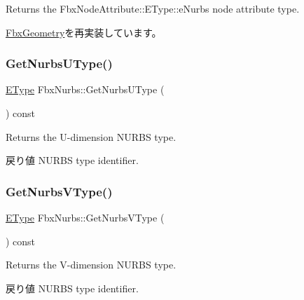 Returns the Fbx\+Node\+Attribute\+::\+E\+Type\+::e\+Nurbs node attribute type. 



\hyperlink{class_fbx_geometry_a41ae23e5d0cf08693bca49737f333de9}{Fbx\+Geometry}を再実装しています。

\mbox{\label{class_fbx_nurbs_a3e11b91a48634ca8a7e082f80aae9013}} 
\subsubsection{\texorpdfstring{Get\+Nurbs\+U\+Type()}{GetNurbsUType()}}
{\footnotesize\ttfamily \hyperlink{class_fbx_nurbs_a16d9562676c9d3511503551790c55643}{E\+Type} Fbx\+Nurbs\+::\+Get\+Nurbs\+U\+Type (\begin{DoxyParamCaption}{ }\end{DoxyParamCaption}) const}

Returns the U-\/dimension N\+U\+R\+BS type. \begin{DoxyReturn}{戻り値}
N\+U\+R\+BS type identifier. 
\end{DoxyReturn}
\mbox{\label{class_fbx_nurbs_a07928e9890078aa451609132d263167c}} 
\subsubsection{\texorpdfstring{Get\+Nurbs\+V\+Type()}{GetNurbsVType()}}
{\footnotesize\ttfamily \hyperlink{class_fbx_nurbs_a16d9562676c9d3511503551790c55643}{E\+Type} Fbx\+Nurbs\+::\+Get\+Nurbs\+V\+Type (\begin{DoxyParamCaption}{ }\end{DoxyParamCaption}) const}

Returns the V-\/dimension N\+U\+R\+BS type. \begin{DoxyReturn}{戻り値}
N\+U\+R\+BS type identifier. 
\end{DoxyReturn}
\mbox{\label{class_fbx_nurbs_a9b482acc4ada0ebd438e8fde99c54b7e}} 
